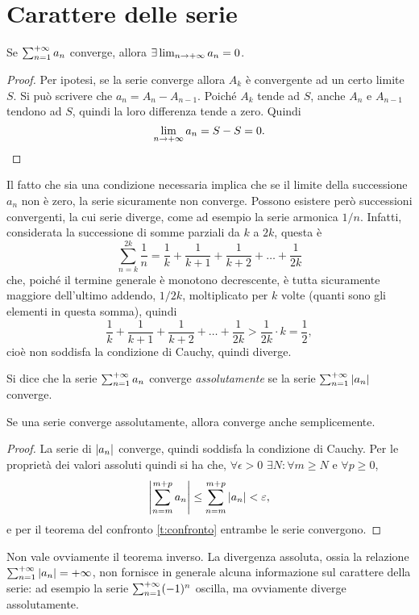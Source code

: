 \section{Carattere delle serie}
\begin{teorema}
Se $\sum_{{n}=1}^{+\infty}a_n$ converge, allora $\exists\lim_{n\to+\infty}a_n=0$.
\end{teorema}
\begin{proof}
Per ipotesi, se la serie converge allora $A_k$ è convergente ad un certo limite $S$. Si può scrivere che $a_n=A_n-A_{n-1}$. Poiché $A_k$ tende ad $S$, anche $A_n$ e $A_{n-1}$ tendono ad $S$, quindi la loro differenza tende a zero. Quindi
\[
\lim_{n\to+\infty}a_n=S-S=0.\qedhere
\]
\end{proof}
Il fatto che sia una condizione necessaria implica che se il limite della successione $a_n$ non è zero, la serie sicuramente non converge. Possono esistere però successioni convergenti, la cui serie diverge, come ad esempio la serie armonica $1/n$. Infatti, considerata la successione di somme parziali da $k$ a $2k$, questa è
\[
\sum_{n=k}^{2k}\frac1{n}=\frac1{k}+\frac1{k+1}+\frac1{k+2}+\dots+\frac1{2k}
\]
che, poiché il termine generale è monotono decrescente, è tutta sicuramente maggiore dell'ultimo addendo, $1/2k$, moltiplicato per $k$ volte (quanti sono gli elementi in questa somma), quindi
\[
\frac1{k}+\frac1{k+1}+\frac1{k+2}+\dots+\frac1{2k}>\frac1{2k}\cdot k=\frac12,
\]
cioè non soddisfa la condizione di Cauchy, quindi diverge.
\begin{definizione}
\label{d:conv_assoluta}
Si dice che la serie $\sum_{{n}=1}^{+\infty}a_n$ converge \emph{assolutamente} se la serie $\sum_{{n}=1}^{+\infty}\left|{a_n}\right|$ converge.
\end{definizione}
\begin{teorema}
Se una serie converge assolutamente, allora converge anche semplicemente.
\end{teorema}
\begin{proof}
La serie di $\left|{a_n}\right|$ converge, quindi soddisfa la condizione di Cauchy. Per le proprietà dei valori assoluti quindi si ha che, $\forall\epsilon>0$ $\exists N\colon\forall m\geq N$ e $\forall p\geq 0$,
\[
\left|{\sum_{n=m}^{m+p}a_n}\right|\leq\sum_{n=m}^{m+p}\left|{a_n}\right|<\varepsilon,
\]
e per il teorema del confronto \ref{t:confronto} entrambe le serie convergono.
\end{proof}
Non vale ovviamente il teorema inverso. La divergenza assoluta, ossia la relazione $\sum_{{n}=1}^{+\infty}\left|{a_n}\right|=+\infty$, non fornisce in generale alcuna informazione sul carattere della serie: ad esempio la serie $\sum_{{n}=1}^{+\infty}(-1)^n$ oscilla, ma ovviamente diverge assolutamente.

